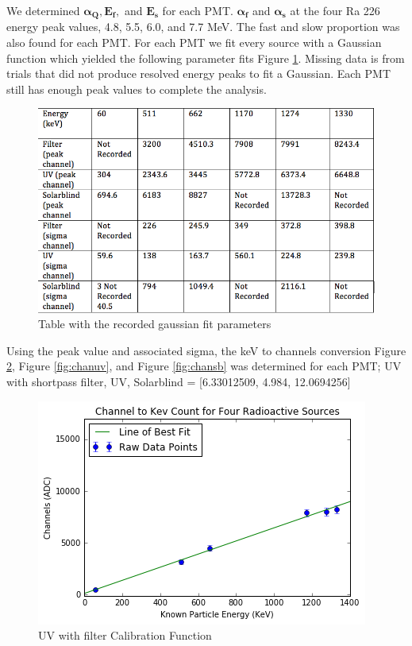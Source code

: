 \documentclass[aip, jmp, amssymb, amsmath, reprint, floatfix]{revtex4-1}
\begin{document}
We determined $\bm{\alpha_Q, E_f,}$ and $\bm{E_s}$ for each PMT. $\bm{\alpha_f}$ and $\bm{\alpha_s}$ at the four Ra 226 energy peak values, 4.8, 5.5, 6.0, and 7.7 MeV. The fast and slow proportion was also found for each PMT. For each PMT we fit every source with a Gaussian function which yielded the following parameter fits Figure \ref{fig:gaussfits}. Missing data is from trials that did not produce resolved energy peaks to fit a Gaussian. Each PMT still has enough peak values to complete the analysis. 


\begin{figure}
  \centering
    \includegraphics[width=.8\columnwidth]{gaussfits.png}
  \caption{Table with the recorded gaussian fit parameters}
  \label{fig:gaussfits}
\end{figure} 

\noindent
Using the peak value and associated sigma, the keV to channels conversion Figure \ref{fig:chanf}, Figure \ref{fig:chanuv}, and Figure \ref{fig:chansb} was determined for each PMT; UV with shortpass filter, UV, Solarblind = [6.33012509, 4.984, 12.0694256] 

\begin{figure}
  \centering
    \includegraphics[width=.8\columnwidth]{chanf.png}
  \caption{UV with filter Calibration Function}
  \label{fig:chanf}
\end{figure} 
\end{document}

